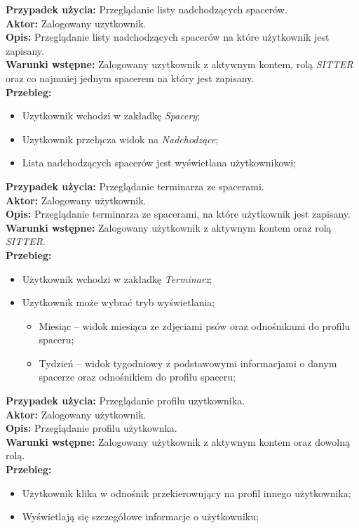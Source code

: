 \noindent
\textbf{Przypadek użycia:} Przeglądanie listy nadchodzących spacerów. \\
\textbf{Aktor:} Zalogowany uzytkownik. \\
\textbf{Opis:} Przeglądanie listy nadchodzących spacerów na które użytkownik jest zapisany. \\
\textbf{Warunki wstępne:} Zalogowany uzytkownik z aktywnym kontem, rolą \textit{SITTER} oraz co najmniej jednym spacerem na który jest zapisany. \\
\textbf{Przebieg:}
\begin{itemize}[leftmargin=1cm]
    \item Uzytkownik wchodzi w zakładkę \textit{Spacery};
    \item Uzytkownik przełącza widok na \textit{Nadchodzące};
    \item Lista nadchodzących spacerów jest wyświetlana użytkownikowi;
\end{itemize}

\noindent
\textbf{Przypadek użycia:} Przeglądanie terminarza ze spacerami. \\
\textbf{Aktor:} Zalogowany użytkownik. \\
\textbf{Opis:} Przeglądanie terminarza ze spacerami, na które użytkownik jest zapisany. \\
\textbf{Warunki wstępne:} Zalogowany użytkownik z aktywnym kontem oraz rolą \textit{SITTER}. \\
\textbf{Przebieg:}
\begin{itemize}[leftmargin=1cm]
    \item Użytkownik wchodzi w zakładkę \textit{Terminarz};
    \item Uzytkownik może wybrać tryb wyświetlania;
    \begin{itemize}
        \item Miesiąc -- widok miesiąca ze zdjęciami psów oraz odnośnikami do profilu spaceru;
        \item Tydzień -- widok tygodniowy z podstawowymi informacjami o danym spacerze oraz odnośnikiem do profilu spaceru;
    \end{itemize}
\end{itemize}

\noindent
\textbf{Przypadek użycia:} Przeglądanie profilu uzytkownika. \\
\textbf{Aktor:} Zalogowany użytkownik. \\
\textbf{Opis:} Przeglądanie profilu użytkownka. \\
\textbf{Warunki wstępne:} Zalogowany użytkownik z aktywnym kontem oraz dowolną rolą. \\
\textbf{Przebieg:}
\begin{itemize}[leftmargin=1cm]
    \item Użytkownik klika w odnośnik przekierowujący na profil innego użytkownika;
    \item Wyświetlają się szczegółowe informacje o użytkowniku;
\end{itemize}


